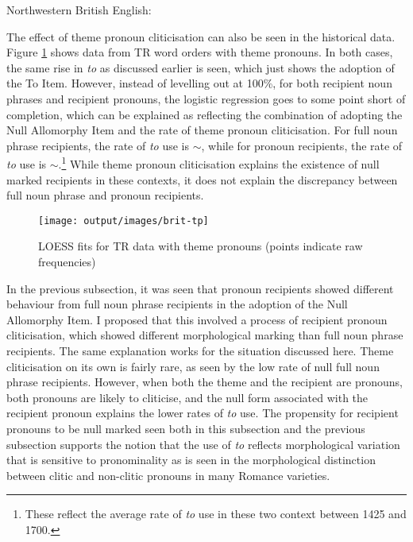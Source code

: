 	\begin{exe}
		 Northwestern British English:
		\begin{xlist}
	\end{xlist}
	\end{exe}

	The effect of theme pronoun cliticisation can also be seen in the historical data. Figure \ref{fig:brit-tp} shows data from TR word orders with theme pronouns. In both cases, the same rise in \textit{to} as discussed earlier is seen, which just shows the adoption of the To Item. However, instead of levelling out at 100\%, for both recipient noun phrases and recipient pronouns, the logistic regression goes to some point short of completion, which can be explained as reflecting the combination of adopting the Null Allomorphy Item and the rate of theme pronoun cliticisation. For full noun phrase recipients, the rate of \textit{to} use is $\sim$, while for pronoun recipients, the rate of \textit{to} use is $\sim$.\footnote{These reflect the average rate of \textit{to} use in these two context between 1425 and 1700.} While theme pronoun cliticisation explains the existence of null marked recipients in these contexts, it does not explain the discrepancy between full noun phrase and pronoun recipients.

	\begin{figure}[ht!]
		\texttt{[image: output/images/brit-tp]}
		\caption{LOESS fits for TR data with theme pronouns (points indicate raw frequencies)}
		\label{fig:brit-tp}
	\end{figure}

	In the previous subsection, it was seen that pronoun recipients showed different behaviour from full noun phrase recipients in the adoption of the Null Allomorphy Item. I proposed that this involved a process of recipient pronoun cliticisation, which showed different morphological marking than full noun phrase recipients. The same explanation works for the situation discussed here. Theme cliticisation on its own is fairly rare, as seen by the low rate of null full noun phrase recipients. However, when both the theme and the recipient are pronouns, both pronouns are likely to cliticise, and the null form associated with the recipient pronoun explains the lower rates of \textit{to} use. The propensity for recipient pronouns to be null marked seen both in this subsection and the previous subsection supports the notion that the use of \textit{to} reflects morphological variation that is sensitive to pronominality as is seen in the morphological distinction between clitic and non-clitic pronouns in many Romance varieties.

